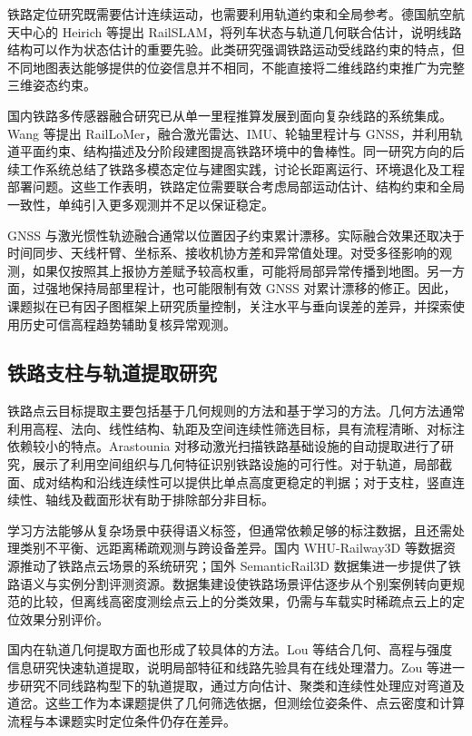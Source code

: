 \documentclass[UTF8,a4paper,12pt,fontset=fandol]{ctexart}
\begin{document}
铁路定位研究既需要估计连续运动，也需要利用轨道约束和全局参考。德国航空航天中心的 Heirich 等提出 RailSLAM，将列车状态与轨道几何联合估计，说明线路结构可以作为状态估计的重要先验\cite{heirich2013railslam}。此类研究强调铁路运动受线路约束的特点，但不同地图表达能够提供的位姿信息并不相同，不能直接将二维线路约束推广为完整三维姿态约束。

国内铁路多传感器融合研究已从单一里程推算发展到面向复杂线路的系统集成。Wang 等提出 RailLoMer，融合激光雷达、IMU、轮轴里程计与 GNSS，并利用轨道平面约束、结构描述及分阶段建图提高铁路环境中的鲁棒性\cite{wang2021raillomer}。同一研究方向的后续工作系统总结了铁路多模态定位与建图实践，讨论长距离运行、环境退化及工程部署问题\cite{wang2024fouryears}。这些工作表明，铁路定位需要联合考虑局部运动估计、结构约束和全局一致性，单纯引入更多观测并不足以保证稳定。

GNSS 与激光惯性轨迹融合通常以位置因子约束累计漂移。实际融合效果还取决于时间同步、天线杆臂、坐标系、接收机协方差和异常值处理。对受多径影响的观测，如果仅按照其上报协方差赋予较高权重，可能将局部异常传播到地图。另一方面，过强地保持局部里程计，也可能限制有效 GNSS 对累计漂移的修正。因此，课题拟在已有因子图框架上研究质量控制，关注水平与垂向误差的差异，并探索使用历史可信高程趋势辅助复核异常观测。

\subsection{铁路支柱与轨道提取研究}

铁路点云目标提取主要包括基于几何规则的方法和基于学习的方法。几何方法通常利用高程、法向、线性结构、轨距及空间连续性筛选目标，具有流程清晰、对标注依赖较小的特点。Arastounia 对移动激光扫描铁路基础设施的自动提取进行了研究，展示了利用空间组织与几何特征识别铁路设施的可行性\cite{arastounia2015infrastructure}。对于轨道，局部截面、成对结构和沿线连续性可以提供比单点高度更稳定的判据；对于支柱，竖直连续性、轴线及截面形状有助于排除部分非目标。

学习方法能够从复杂场景中获得语义标签，但通常依赖足够的标注数据，且还需处理类别不平衡、远距离稀疏观测与跨设备差异。国内 WHU-Railway3D 等数据资源推动了铁路点云场景的系统研究\cite{whurailway3d}；国外 SemanticRail3D 数据集进一步提供了铁路语义与实例分割评测资源\cite{ghasemlou2026semanticrail3d}。数据集建设使铁路场景评估逐步从个别案例转向更规范的比较，但离线高密度测绘点云上的分类效果，仍需与车载实时稀疏点云上的定位效果分别评价。

国内在轨道几何提取方面也形成了较具体的方法。Lou 等结合几何、高程与强度信息研究快速轨道提取，说明局部特征和线路先验具有在线处理潜力\cite{lou2018rail}。Zou 等进一步研究不同线路构型下的轨道提取，通过方向估计、聚类和连续性处理应对弯道及道岔\cite{zou2019rail}。这些工作为本课题提供了几何筛选依据，但测绘位姿条件、点云密度和计算流程与本课题实时定位条件仍存在差异。
\end{document}

